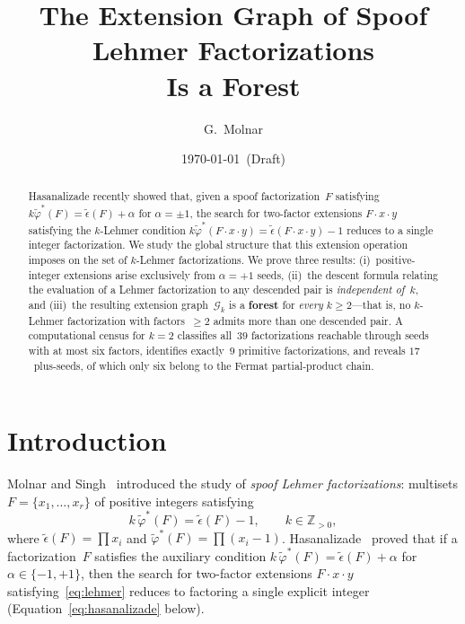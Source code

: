 \documentclass[11pt]{article}
\title{The Extension Graph of Spoof Lehmer Factorizations\\
Is a Forest}
\author{G.\ Molnar}
\date{\today~(Draft)}
\theoremstyle{definition}
\theoremstyle{remark}
\newcommand{\eps}{\tilde{\epsilon}}
\newcommand{\phist}{\tilde{\varphi}^*}
\newcommand{\Z}{\mathbb{Z}}
\begin{document}
\maketitle

\begin{abstract}
Hasanalizade recently showed that, given a spoof factorization~$F$
satisfying $k\phist(F) = \eps(F) + \alpha$ for $\alpha = \pm 1$, the search
for two-factor extensions $F \cdot x \cdot y$ satisfying the $k$-Lehmer
condition $k\phist(F \cdot x \cdot y) = \eps(F \cdot x \cdot y) - 1$
reduces to a single integer factorization.  We study the global structure
that this extension operation imposes on the set of $k$-Lehmer
factorizations.  We prove three results: (i)~positive-integer extensions
arise exclusively from $\alpha = +1$ seeds, (ii)~the descent
formula relating the evaluation of a Lehmer factorization to any descended
pair is \emph{independent of~$k$}, and (iii)~the resulting extension
graph~$\mathcal{G}_k$ is a \textbf{forest} for \emph{every}
$k \ge 2$---that is, no $k$-Lehmer factorization with factors~$\ge 2$
admits more than one descended pair.  A computational census for
$k = 2$ classifies all~$39$ factorizations reachable through seeds with at
most six factors, identifies exactly~$9$ primitive factorizations, and
reveals $17$~plus-seeds, of which only six belong to the Fermat
partial-product chain.
\end{abstract}


\section{Introduction}

Molnar and Singh~\cite{MS26} introduced the study of \emph{spoof Lehmer
factorizations}: multisets $F = \{x_1, \ldots, x_r\}$ of positive integers
satisfying
\begin{equation}\label{eq:lehmer}
  k\,\phist(F) = \eps(F) - 1,
  \qquad k \in \Z_{>0},
\end{equation}
where $\eps(F) = \prod x_i$ and $\phist(F) = \prod (x_i - 1)$.
Hasanalizade~\cite{H26} proved that if a factorization~$F$ satisfies the
auxiliary condition $k\,\phist(F) = \eps(F) + \alpha$ for
$\alpha \in \{-1, +1\}$, then the search for two-factor extensions
$F \cdot x \cdot y$ satisfying~\eqref{eq:lehmer} reduces to factoring a
single explicit integer (Equation~\eqref{eq:hasanalizade} below).
\end{document}
